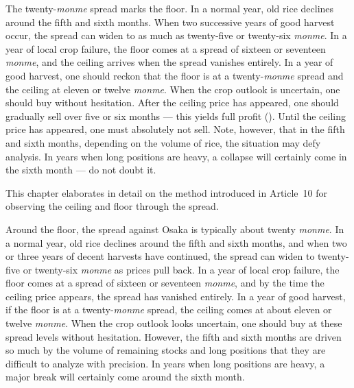 
\begin{sokyubox}
{\small\itshape\color{sokyubar} }

\medskip
The twenty-\textit{monme} spread marks the floor. In a normal year, old
rice declines around the fifth and sixth months. When two successive
years of good harvest occur, the spread can widen to as much as
twenty-five or twenty-six \textit{monme}. In a year of local crop failure,
the floor comes at a spread of sixteen or seventeen \textit{monme}, and the
ceiling arrives when the spread vanishes entirely. In a year of
good harvest, one should reckon that the floor is at a twenty-\textit{monme}
spread and the ceiling at eleven or twelve \textit{monme}. When the crop
outlook is uncertain, one should buy without hesitation. After the
ceiling price has appeared, one should gradually sell over five or
six months --- this yields full profit ().
Until the ceiling price has appeared, one must absolutely not sell.
Note, however, that in the fifth and sixth months, depending on
the volume of rice, the situation may defy analysis. In years when
long positions are heavy, a collapse will certainly come in the
sixth month --- do not doubt it.
\end{sokyubox}

\commentary
This chapter elaborates in detail on the method introduced in
Article~10 for observing the ceiling and floor through the spread.

Around the floor, the spread against Osaka is typically about
twenty \textit{monme}. In a normal year, old rice declines around the fifth
and sixth months, and when two or three years of decent harvests
have continued, the spread can widen to twenty-five or twenty-six
\textit{monme} as prices pull back. In a year of local crop failure, the
floor comes at a spread of sixteen or seventeen \textit{monme}, and by the
time the ceiling price appears, the spread has vanished entirely. In
a year of good harvest, if the floor is at a twenty-\textit{monme} spread,
the ceiling comes at about eleven or twelve \textit{monme}. When the crop
outlook looks uncertain, one should buy at these spread levels
without hesitation. However, the fifth and sixth months are driven
so much by the volume of remaining stocks and long positions that
they are difficult to analyze with precision. In years when long
positions are heavy, a major break will certainly come around the
sixth month.

